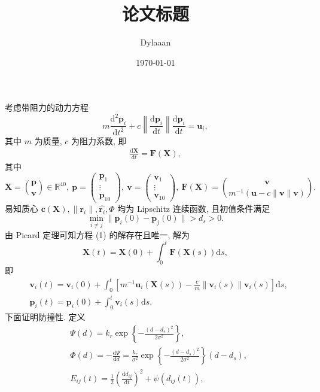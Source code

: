 \documentclass[12pt, a4paper, oneside]{ctexart}
\title{\textbf{论文标题}}
\author{Dylaaan}
\date{\today}
\begin{document}
考虑带阻力的动力方程
\begin{equation*}
	m\frac{\mathrm{d}^2\boldsymbol{p}_i}{\mathrm{d}t^2}+c\left\|\frac{\mathrm{d}\boldsymbol{p}_i}{\mathrm{d}t}\right\|\frac{\mathrm{d}\boldsymbol{p}_i}{\mathrm{d}t}=\boldsymbol{u}_i,
\end{equation*}
其中 $m$ 为质量, $c$ 为阻力系数, 即
\begin{align}
	\frac{\mathrm{d}\boldsymbol{X}}{\mathrm{d}t}=\boldsymbol{F}(\boldsymbol{X}),
\end{align}
其中
\begin{equation*}
	\boldsymbol{X}=\binom{\boldsymbol{p}}{\boldsymbol{v}}\in\mathbb{R}^{40},\ \boldsymbol{p}=\begin{pmatrix}
		\boldsymbol{p}_1\\\vdots\\\boldsymbol{p}_{10}
	\end{pmatrix},\ \boldsymbol{v}=\begin{pmatrix}
	\boldsymbol{v}_1\\\vdots\\\boldsymbol{v}_{10}
\end{pmatrix},\ \boldsymbol{F}(\boldsymbol{X})=\binom{\boldsymbol{v}}{m^{-1}(\boldsymbol{u}-c\|\boldsymbol{v}\|\boldsymbol{v})}.
\end{equation*}
易知质心 $\boldsymbol{c}(\boldsymbol{X}),\|\boldsymbol{r}_i\|,\widehat{\boldsymbol{r}_i},\mathit{\Phi}$ 均为 Lipschitz 连续函数, 且初值条件满足
\begin{equation*}
	\min_{i\ne j}\|\boldsymbol{p}_i(0)-\boldsymbol{p}_j(0)\|>d_s>0.
\end{equation*}
由 Picard 定理可知方程 (1) 的解存在且唯一, 解为
\begin{equation*}
	\boldsymbol{X}(t)=\boldsymbol{X}(0)+\int_0^t\boldsymbol{F}(\boldsymbol{X}(s))\mathrm{d}s,
\end{equation*}
即
\begin{align*}
	&\boldsymbol{v}_i(t)=\boldsymbol{v}_i(0)+\int_0^t\left[m^{-1}\boldsymbol{u}_i(\boldsymbol{X}(s))-\frac{c}{m}\|\boldsymbol{v}_i(s)\|\boldsymbol{v}_i(s)\right]\mathrm{d}s,\\
	&\boldsymbol{p}_i(t)=\boldsymbol{p}_i(0)+\int_0^t\boldsymbol{v}_i(s)\mathrm{d}s.
\end{align*}
下面证明防撞性. 定义
\begin{align*}
	&\mathit{\Psi}(d)=k_r\exp\left\{-\frac{(d-d_s)^2}{2\sigma^2}\right\},\\
	&\mathit{\Phi}(d)=-\frac{\mathrm{d}\mathit{\Psi}}{\mathrm{d}d}=\frac{k_r}{\sigma^2}\exp\left\{-\frac{(d-d_s)^2}{2\sigma^2}\right\}(d-d_s),\\
	&E_{ij}(t)=\frac{1}{2}\left(\frac{\mathrm{d}d_{ij}}{\mathrm{d}t}\right)^2+\psi(d_{ij}(t)),
\end{align*}
\end{document}
